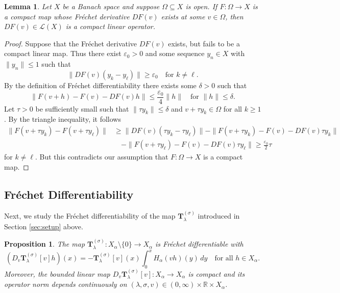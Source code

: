 \documentclass[reqno,10pt,a4paper]{amsart}
\newtheorem{lem}{Lemma}[section]
\newtheorem{prop}{Proposition}[section]
\theoremstyle{definition}
\theoremstyle{definition}
\theoremstyle{remark}
\theoremstyle{remark}
\numberwithin{equation}{section}
\newcommand{\R}{\mathbb{R}}
\newcommand{\eps}{\varepsilon}
\newcommand{\Tss}{\mathbf{T}^{(\sigma)}_\lambda}
\begin{document}
\begin{appendix}
\begin{lem} \label{lem:compact_frechet}
Let $X$ be a Banach space and suppose $\Omega \subseteq X$ is open. If $F : \Omega \to X $ is a compact map whose Fr\'echet derivative $DF(v)$ exists at some $v \in \Omega$, then $DF(v) \in \mathcal{L}(X)$ is a compact linear operator. 
\end{lem}

\begin{proof}
Suppose that the Fr\'echet derivative $DF(v)$ exists, but fails to be a compact linear map. Thus there exist $\eps_0 > 0$ and some sequence $y_n \in X$ with $\| y_n \| \leq 1$ such that
$$
\| DF(v) ( y_k -  y_\ell) \| \geq \eps_0 \quad \mbox{for $k \neq \ell$}.
$$ 
By the definition of Fr\'echet differentiability there exists some $\delta > 0$ such that
$$
\| F(v+h) - F(v) - DF(v) h \| \leq \frac{\eps_0}{4} \| h \| \quad \mbox{for $\| h \| \leq \delta$}.
$$
Let $\tau > 0$ be sufficiently small such that $\| \tau y_k \| \leq \delta$ and $v + \tau y_k \in \Omega$ for all $k \geq 1$. By the triangle inequality, it follows
\begin{align*}
\| F(v+\tau y_k)-F(v+ \tau y_\ell)\| & \geq \| DF(v)(\tau y_k - \tau y_\ell)\| - \| F(v+ \tau y_k) - F(v) - DF(v) \tau y_k \| \\
& \quad - \| F(v+ \tau y_\ell) - F(v)- DF(v) \tau y_\ell \| \geq \frac{\eps_0}{2} \tau   
\end{align*}
for $k \neq \ell$. But this contradicts our assumption that $F : \Omega \to X$ is a compact map.
\end{proof}

\subsection{Fr\'echet Differentiability} 
Next, we study the Fr\'echet differentiability of the map $\Tss$ introduced in Section \ref{sec:setup} above. 

\begin{prop} \label{prop:frechet}
The map $\Tss : X_\alpha \setminus \{ 0 \} \to X_\alpha$ is Fr\'echet differentiable with
$$
(D_v \Tss[v]h)(x) = -\Tss[v](x) \int_0^x H_\alpha(vh)(y) \, dy \quad \mbox{for all $h \in X_\alpha$}.
$$
Moreover, the bounded linear map $D_v \Tss[v]: X_\alpha \to X_\alpha$ is compact and its operator norm depends continuously on $(\lambda, \sigma, v) \in (0, \infty) \times \R \times X_\alpha$.
\end{prop}


\end{appendix}
\end{document}
